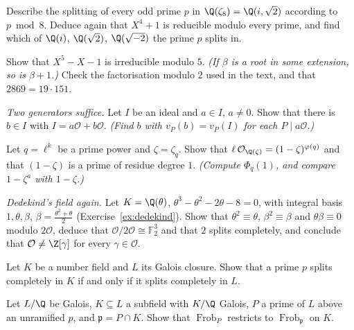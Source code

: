\begin{exercise}[$\star$]\label{ex:zeta8}
Describe the splitting of every odd prime $p$ in $\Q(\zeta_8)=\Q(i,\sqrt2)$ according to $p\bmod8$. Deduce again that
$X^4+1$ is reducible modulo every prime, and find which of $\Q(i)$, $\Q(\sqrt2)$, $\Q(\sqrt{-2})$ the prime $p$ splits
in.
\end{exercise}

\begin{exercise}[$\star\star$]\label{ex:s5}
Show that $X^5-X-1$ is irreducible modulo $5$. \emph{(If $\beta$ is a root in some extension, so is $\beta+1$.)}
Check the factorisation modulo $2$ used in the text, and that $2869=19\cdot151$.
\end{exercise}

\begin{exercise}[$\star\star$]\label{ex:twogen}
\emph{Two generators suffice.} Let $I$ be an ideal and $a\in I$, $a\ne0$. Show that there is $b\in I$ with $I=a\mathcal
O+b\mathcal O$. \emph{(Find $b$ with $v_P(b)=v_P(I)$ for each $P\mid a\mathcal O$.)}
\end{exercise}

\begin{exercise}[$\star\star$]\label{ex:totram}
Let $q=\ell^k$ be a prime power and $\zeta=\zeta_q$. Show that $\ell\,\mathcal O_{\Q(\zeta)}=(1-\zeta)^{\varphi(q)}$ and
that $(1-\zeta)$ is a prime of residue degree $1$. \emph{(Compute $\Phi_q(1)$, and compare $1-\zeta^a$ with $1-\zeta$.)}
\end{exercise}

\begin{exercise}[$\star\star$]\label{ex:dedekindfield}
\emph{Dedekind's field again.} Let $K=\Q(\theta)$, $\theta^3-\theta^2-2\theta-8=0$, with integral basis $1,\theta,\beta$,
$\beta=\frac{\theta^2+\theta}2$ (Exercise~\ref{ex:dedekind}). Show that $\theta^2\equiv\theta$, $\beta^2\equiv\beta$ and
$\theta\beta\equiv0$ modulo $2\mathcal O$, deduce that $\mathcal O/2\mathcal O\cong\mathbb F_2^3$ and that $2$ splits
completely, and conclude that $\mathcal O\ne\Z[\gamma]$ for every $\gamma\in\mathcal O$.
\end{exercise}

\begin{exercise}[$\star\star$]\label{ex:closure}
Let $K$ be a number field and $L$ its Galois closure. Show that a prime $p$ splits completely in $K$ if and only if it
splits completely in $L$.
\end{exercise}

\begin{exercise}[$\star\star$]\label{ex:frobsub}
Let $L/\Q$ be Galois, $K\subseteq L$ a subfield with $K/\Q$ Galois, $P$ a prime of $L$ above an unramified $p$, and
$\mathfrak p=P\cap K$. Show that $\operatorname{Frob}_P$ restricts to $\operatorname{Frob}_{\mathfrak p}$ on $K$.
\end{exercise}

